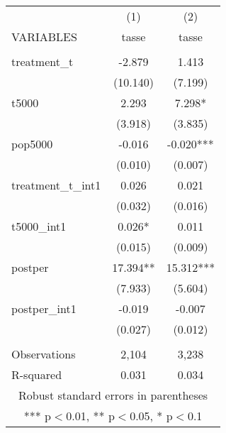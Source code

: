 \documentclass[]{article}
\begin{document}
\begin{tabular}{lcc} \hline
 & (1) & (2) \\
VARIABLES & tasse & tasse \\ \hline
 &  &  \\
treatment\_t & -2.879 & 1.413 \\
 & (10.140) & (7.199) \\
t5000 & 2.293 & 7.298* \\
 & (3.918) & (3.835) \\
pop5000 & -0.016 & -0.020*** \\
 & (0.010) & (0.007) \\
treatment\_t\_int1 & 0.026 & 0.021 \\
 & (0.032) & (0.016) \\
t5000\_int1 & 0.026* & 0.011 \\
 & (0.015) & (0.009) \\
postper & 17.394** & 15.312*** \\
 & (7.933) & (5.604) \\
postper\_int1 & -0.019 & -0.007 \\
 & (0.027) & (0.012) \\
 &  &  \\
Observations & 2,104 & 3,238 \\
 R-squared & 0.031 & 0.034 \\ \hline
\multicolumn{3}{c}{ Robust standard errors in parentheses} \\
\multicolumn{3}{c}{ *** p$<$0.01, ** p$<$0.05, * p$<$0.1} \\
\end{tabular}
\end{document}
